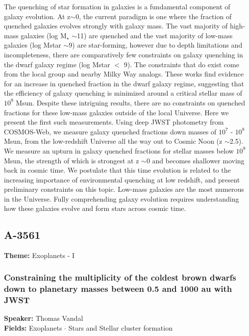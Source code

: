 The quenching of star formation in galaxies is a fundamental component of galaxy evolution. At z$\sim$0, the current paradigm is one where the fraction of quenched galaxies evolves strongly with galaxy mass. The vast majority of high-mass galaxies (log M$_\star$ $\sim$11) are quenched and the vast majority of low-mass galaxies (log Mstar $\sim$9) are star-forming, however due to depth limitations and incompleteness, there are comparatively few constraints on galaxy quenching in the dwarf galaxy regime (log Mstar $<$ 9). The constraints that do exist come from the local group and nearby Milky Way analogs. These works find evidence for an increase in quenched fraction in the dwarf galaxy regime, suggesting that the efficiency of galaxy quenching is minimized around a critical stellar mass of $10^{9}$ Msun. Despite these intriguing results, there are no constraints on quenched fractions for these low-mass galaxies outside of the local Universe. Here we present the first such measurements. Using deep JWST photometry from COSMOS-Web, we measure galaxy quenched fractions down masses of $10^{7}$ - $10^{8}$ Msun, from the low-redshift Universe all the way out to Cosmic Noon (z $\sim$2.5). We measure an upturn in galaxy quenched fractions for stellar masses below $10^{9}$ Msun, the strength of which is strongest at z $\sim$0 and becomes shallower moving back in cosmic time. We postulate that this time evolution is related to the increasing importance of environmental quenching at low redshift, and present preliminary constraints on this topic. Low-mass galaxies are the most numerous in the Universe. Fully comprehending galaxy evolution requires understanding how these galaxies evolve and form stars across cosmic time.

\subsection*{A-3561}
\textbf{Theme:} Exoplanets - I

\hypertarget{abstract-talk-233}{}\label{abstract-page-talk-233}
\subsubsection*{Constraining the multiplicity of the coldest brown dwarfs down to planetary masses between 0.5 and 1000 au with JWST}
\textbf{Speaker:} Thomas Vandal\\
\textbf{Fields:} Exoplanets $\cdot$ Stars and Stellar cluster formation

